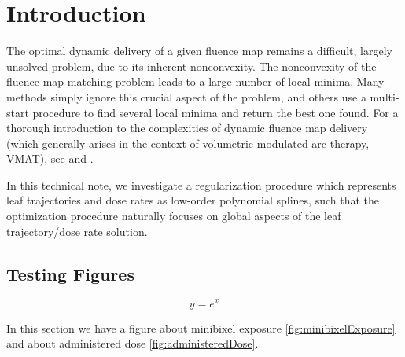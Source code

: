 \section{Introduction}
The optimal dynamic delivery of a given fluence map remains a difficult, largely unsolved problem, due to its inherent nonconvexity.
The nonconvexity of the fluence map matching problem leads to a large number of local minima.
Many methods simply ignore this crucial aspect of the problem, and others use a multi-start procedure to find several local minima and return the best one found.
For a thorough introduction to the complexities of dynamic fluence map delivery (which generally arises in the context of volumetric modulated arc therapy, VMAT),
see \cite{balvertcraft} and \cite{unkvmatreview}.

In this technical note, we investigate a regularization procedure which represents leaf trajectories and dose rates as low-order polynomial splines\footnotemark,
such that the optimization procedure naturally focuses on global aspects of the leaf trajectory/dose rate solution.


\subsection{Testing Figures}


\begin{equation}
y = e^x
\label{eqn:minibixelRefEqnTemplate}
\end{equation}





In this section we have a figure about minibixel exposure \ref{fig:minibixelExposure} and about administered dose \ref{fig:administeredDose}.

